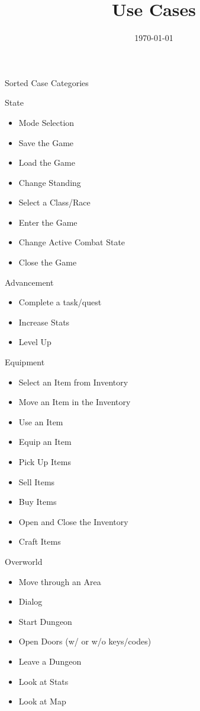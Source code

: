 \documentclass[12pt]{article}
\title{Use Cases}
\date{\today}
\begin{document}
\begin{section}{Sorted Case Categories}
\begin{subsection}{State}
\begin{itemize}
\item Mode Selection
\item Save the Game
\item Load the Game
\item Change Standing
\item Select a Class/Race
\item Enter the Game
\item Change Active Combat State
\item Close the Game
\end{itemize}
\end{subsection}

\begin{subsection}{Advancement}
\begin{itemize}
\item Complete a task/quest
\item Increase Stats
\item Level Up
\end{itemize}
\end{subsection}

\begin{subsection}{Equipment}
\begin{itemize}
\item Select an Item from Inventory
\item Move an Item in the Inventory
\item Use an Item
\item Equip an Item
\item Pick Up Items
\item Sell Items
\item Buy Items
\item Open and Close the Inventory
\item Craft Items
\end{itemize}
\end{subsection}

\begin{subsection}{Overworld}
\begin{itemize}
\item Move through an Area
\item Dialog
\item Start Dungeon
\item Open Doors (w/ or w/o keys/codes)
\item Leave a Dungeon
\item Look at Stats
\item Look at Map
\end{itemize}
\end{subsection}


\end{section}
\end{document}
